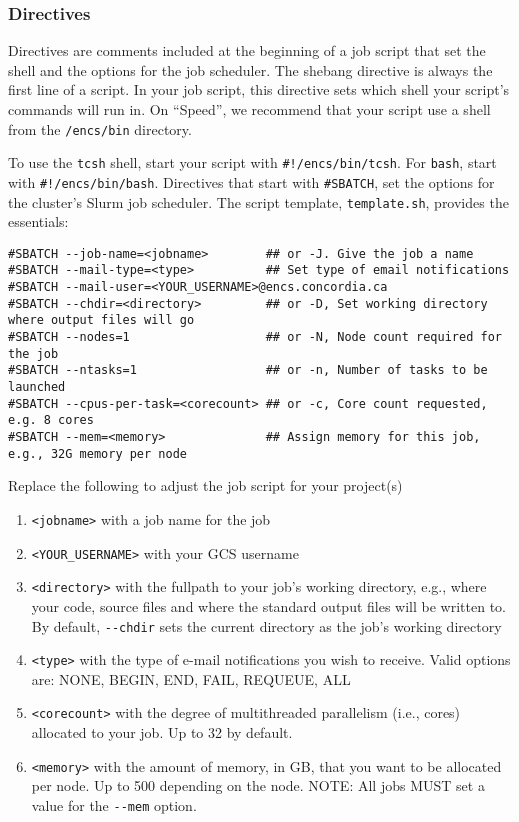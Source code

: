 \subsubsection{Directives}
\label{sect:directives}

Directives are comments included at the beginning of a job script that set the shell 
and the options for the job scheduler. 
%
The shebang directive is always the first line of a script. In your job script, 
this directive sets which shell your script's commands will run in. On ``Speed'', 
we recommend that your script use a shell from the \texttt{/encs/bin} directory. 

To use the \texttt{tcsh} shell, start your script with \verb|#!/encs/bin/tcsh|.
%
For \texttt{bash}, start with \verb|#!/encs/bin/bash|.
%
Directives that start with \verb|#SBATCH|, set the options for the cluster's 
Slurm job scheduler. The script template, \texttt{template.sh}, 
provides the essentials:

\begin{verbatim}
#SBATCH --job-name=<jobname>        ## or -J. Give the job a name 
#SBATCH --mail-type=<type>          ## Set type of email notifications
#SBATCH --mail-user=<YOUR_USERNAME>@encs.concordia.ca 
#SBATCH --chdir=<directory>         ## or -D, Set working directory where output files will go 
#SBATCH --nodes=1                   ## or -N, Node count required for the job
#SBATCH --ntasks=1                  ## or -n, Number of tasks to be launched
#SBATCH --cpus-per-task=<corecount> ## or -c, Core count requested, e.g. 8 cores
#SBATCH --mem=<memory>              ## Assign memory for this job, e.g., 32G memory per node 
\end{verbatim}

Replace the following to adjust the job script for your project(s)
\begin{enumerate}
  \item \verb+<jobname>+ with a job name for the job
  \item \verb+<YOUR_USERNAME>+ with your GCS username
  \item \verb+<directory>+ with the fullpath to your job's working directory, e.g., where your code,
source files and where the standard output files will be written to. By default, \verb+--chdir+
sets the current directory as the job's working directory 
  \item \verb+<type>+ with the type of e-mail notifications you wish to receive. Valid options are: NONE, BEGIN, END, FAIL, REQUEUE, ALL 
  \item \verb+<corecount>+ with the degree of multithreaded parallelism (i.e., cores) allocated to your job. Up to 32 by default.
  \item \verb+<memory>+ with the amount of memory, in GB, that you want to be allocated per node. Up to 500 depending on the node. 
  NOTE: All jobs MUST set a value for the \verb|--mem| option.
\end{enumerate}

